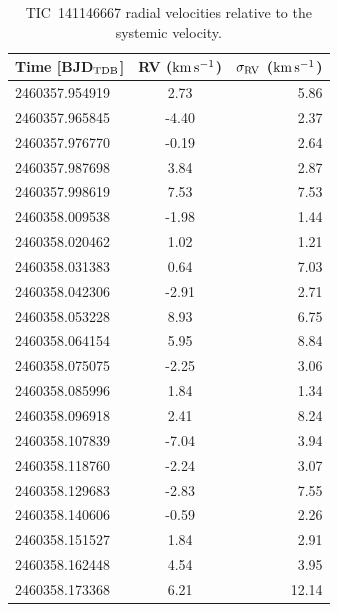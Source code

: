 \documentclass{nature3}
\newcommand{\kms}{\ensuremath{\rm km\,s^{-1}}}
\begin{document}
\begin{methods}
\begin{table}
  \centering
  \begin{tabular}{lcr}
  \hline 
  \hline 
  Time [BJD$_{\rm TDB}$] & RV (\kms) & $\sigma_{\rm RV}$ (\kms) \\
  \hline 
  2460357.954919 & 2.73 & 5.86 \\
  2460357.965845 & -4.40 & 2.37 \\
  2460357.976770 & -0.19 & 2.64 \\
  2460357.987698 & 3.84 & 2.87 \\
  2460357.998619 & 7.53 & 7.53 \\
  2460358.009538 & -1.98 & 1.44 \\
  2460358.020462 & 1.02 & 1.21 \\
  2460358.031383 & 0.64 & 7.03 \\
  2460358.042306 & -2.91 & 2.71 \\
  2460358.053228 & 8.93 & 6.75 \\
  2460358.064154 & 5.95 & 8.84 \\
  2460358.075075 & -2.25 & 3.06 \\
  2460358.085996 & 1.84 & 1.34 \\
  2460358.096918 & 2.41 & 8.24 \\
  2460358.107839 & -7.04 & 3.94 \\
  2460358.118760 & -2.24 & 3.07 \\
  2460358.129683 & -2.83 & 7.55 \\
  2460358.140606 & -0.59 & 2.26 \\
  2460358.151527 & 1.84 & 2.91 \\
  2460358.162448 & 4.54 & 3.95 \\
  2460358.173368 & 6.21 & 12.14 \\
  \hline
  \end{tabular}
  \caption{TIC~141146667 radial velocities relative to the systemic velocity.}
  \label{tab:rv}
\end{table}

\end{methods}



   

\end{document}
